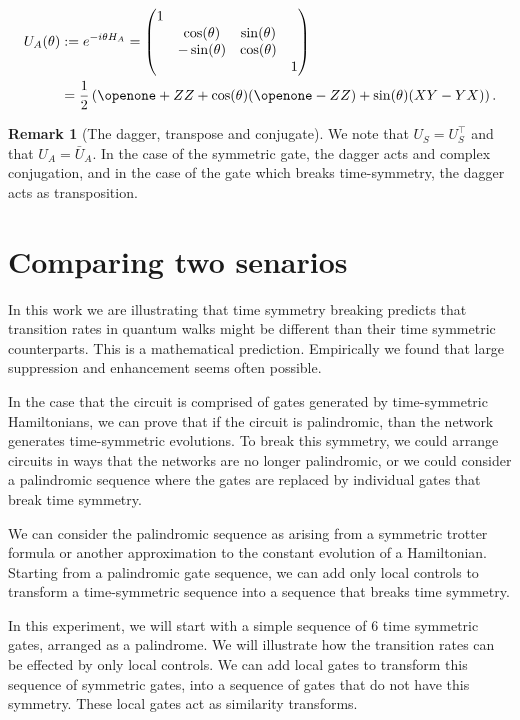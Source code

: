 \documentclass[aps,pra,12pt,nofootinbib,superscriptaddress,longbibliography,showpacs]{revtex4-1}
\theoremstyle{plain}
\theoremstyle{definition}
\newtheorem{remark}[theorem]{Remark}
\newcommand{\I}{\openone}     %
\begin{document}
\begin{align}
\notag
U_A(\theta) &:= e^{-i \theta H_A}
= 
\begin{pmatrix}
1\\
& \cos(\theta) &  \sin(\theta)\\
& -\sin(\theta) & \cos(\theta)\\
& & & 1
\end{pmatrix}\\
&= \frac{1}{2}\left(\I +ZZ +\cos(\theta)(\I-ZZ) + \sin(\theta)(XY-YX)\right).
\end{align}

\begin{remark}[The dagger, transpose and conjugate] 
We note that $U_S=U_S^\top$ and that $U_A=\bar{U}_A$. In the case of the symmetric gate, the dagger acts and complex conjugation, and in the case of the gate which breaks time-symmetry, the dagger acts as transposition.  
\end{remark} 



\section{Comparing two senarios} 

In this work we are illustrating that time symmetry breaking predicts that transition rates in quantum walks might be different than their time symmetric counterparts. This is a mathematical prediction.  Empirically we found that large suppression and enhancement seems often possible.  

In the case that the circuit is comprised of gates generated by time-symmetric Hamiltonians, we can prove that if the circuit is palindromic, than the network generates time-symmetric evolutions.  To break this symmetry, we could arrange circuits in ways that the networks are no longer palindromic, or we could consider a palindromic sequence where the gates are replaced by individual gates that break time symmetry.  

We can consider the palindromic sequence as arising from a symmetric trotter formula or another approximation to the constant evolution of a Hamiltonian.  Starting from a palindromic gate sequence, we can add only local controls to transform a time-symmetric sequence into a sequence that breaks time symmetry.  

In this experiment, we will start with a simple sequence of 6 time symmetric gates, arranged as a palindrome.  We will illustrate how the transition rates can be effected by only local controls.  We can add local gates to transform this sequence of symmetric gates, into a sequence of gates that do not have this symmetry.  These local gates act as similarity transforms.  
\end{document}
